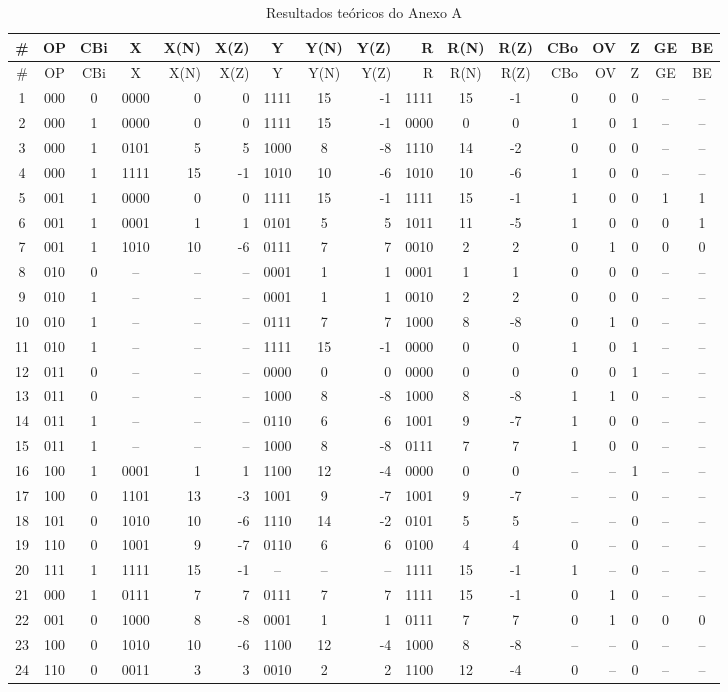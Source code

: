 \documentclass[12pt]{article}
\begin{document}
\begin{center}
\scriptsize
\setlength{\tabcolsep}{2pt}
\begin{longtable}{c c c c r r c c r r c c r r c c c}
\caption{Resultados teóricos do Anexo A}\\
\toprule
\# & OP & CBi & X & X(N) & X(Z) & Y & Y(N) & Y(Z) & R & R(N) & R(Z) & CBo & OV & Z & GE & BE\\
\midrule
\endfirsthead
\toprule
\# & OP & CBi & X & X(N) & X(Z) & Y & Y(N) & Y(Z) & R & R(N) & R(Z) & CBo & OV & Z & GE & BE\\
\midrule
\endhead
1&000&0&0000&0&0&1111&15&-1&1111&15&-1&0&0&0&--&--\\
2&000&1&0000&0&0&1111&15&-1&0000&0&0&1&0&1&--&--\\
3&000&1&0101&5&5&1000&8&-8&1110&14&-2&0&0&0&--&--\\
4&000&1&1111&15&-1&1010&10&-6&1010&10&-6&1&0&0&--&--\\
5&001&1&0000&0&0&1111&15&-1&1111&15&-1&1&0&0&1&1\\
6&001&1&0001&1&1&0101&5&5&1011&11&-5&1&0&0&0&1\\
7&001&1&1010&10&-6&0111&7&7&0010&2&2&0&1&0&0&0\\
8&010&0&--&--&--&0001&1&1&0001&1&1&0&0&0&--&--\\
9&010&1&--&--&--&0001&1&1&0010&2&2&0&0&0&--&--\\
10&010&1&--&--&--&0111&7&7&1000&8&-8&0&1&0&--&--\\
11&010&1&--&--&--&1111&15&-1&0000&0&0&1&0&1&--&--\\
12&011&0&--&--&--&0000&0&0&0000&0&0&0&0&1&--&--\\
13&011&0&--&--&--&1000&8&-8&1000&8&-8&1&1&0&--&--\\
14&011&1&--&--&--&0110&6&6&1001&9&-7&1&0&0&--&--\\
15&011&1&--&--&--&1000&8&-8&0111&7&7&1&0&0&--&--\\
16&100&1&0001&1&1&1100&12&-4&0000&0&0&--&--&1&--&--\\
17&100&0&1101&13&-3&1001&9&-7&1001&9&-7&--&--&0&--&--\\
18&101&0&1010&10&-6&1110&14&-2&0101&5&5&--&--&0&--&--\\
19&110&0&1001&9&-7&0110&6&6&0100&4&4&0&--&0&--&--\\
20&111&1&1111&15&-1&--&--&--&1111&15&-1&1&--&0&--&--\\
21&000&1&0111&7&7&0111&7&7&1111&15&-1&0&1&0&--&--\\
22&001&0&1000&8&-8&0001&1&1&0111&7&7&0&1&0&0&0\\
23&100&0&1010&10&-6&1100&12&-4&1000&8&-8&--&--&0&--&--\\
24&110&0&0011&3&3&0010&2&2&1100&12&-4&0&--&0&--&--\\
\bottomrule
\end{longtable}
\end{center}
\end{document}
